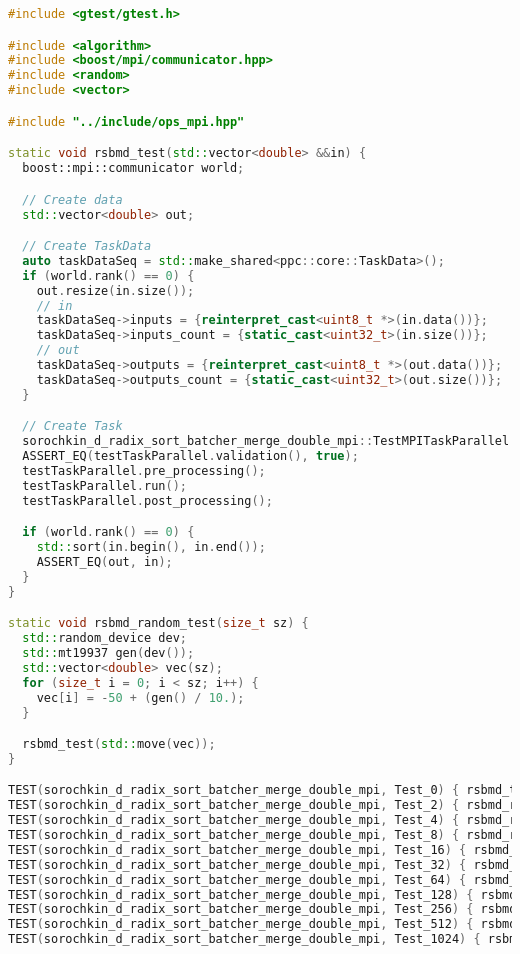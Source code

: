 \documentclass[12pt]{article}
\begin{document}
\begin{lstlisting}[language=C++, caption={Код алгоритма}]
#include <gtest/gtest.h>

#include <algorithm>
#include <boost/mpi/communicator.hpp>
#include <random>
#include <vector>

#include "../include/ops_mpi.hpp"

static void rsbmd_test(std::vector<double> &&in) {
  boost::mpi::communicator world;

  // Create data
  std::vector<double> out;

  // Create TaskData
  auto taskDataSeq = std::make_shared<ppc::core::TaskData>();
  if (world.rank() == 0) {
    out.resize(in.size());
    // in
    taskDataSeq->inputs = {reinterpret_cast<uint8_t *>(in.data())};
    taskDataSeq->inputs_count = {static_cast<uint32_t>(in.size())};
    // out
    taskDataSeq->outputs = {reinterpret_cast<uint8_t *>(out.data())};
    taskDataSeq->outputs_count = {static_cast<uint32_t>(out.size())};
  }

  // Create Task
  sorochkin_d_radix_sort_batcher_merge_double_mpi::TestMPITaskParallel testTaskParallel(taskDataSeq);
  ASSERT_EQ(testTaskParallel.validation(), true);
  testTaskParallel.pre_processing();
  testTaskParallel.run();
  testTaskParallel.post_processing();

  if (world.rank() == 0) {
    std::sort(in.begin(), in.end());
    ASSERT_EQ(out, in);
  }
}

static void rsbmd_random_test(size_t sz) {
  std::random_device dev;
  std::mt19937 gen(dev());
  std::vector<double> vec(sz);
  for (size_t i = 0; i < sz; i++) {
    vec[i] = -50 + (gen() / 10.);
  }

  rsbmd_test(std::move(vec));
}

TEST(sorochkin_d_radix_sort_batcher_merge_double_mpi, Test_0) { rsbmd_test({}); }
TEST(sorochkin_d_radix_sort_batcher_merge_double_mpi, Test_2) { rsbmd_random_test(2); }
TEST(sorochkin_d_radix_sort_batcher_merge_double_mpi, Test_4) { rsbmd_random_test(4); }
TEST(sorochkin_d_radix_sort_batcher_merge_double_mpi, Test_8) { rsbmd_random_test(8); }
TEST(sorochkin_d_radix_sort_batcher_merge_double_mpi, Test_16) { rsbmd_random_test(16); }
TEST(sorochkin_d_radix_sort_batcher_merge_double_mpi, Test_32) { rsbmd_random_test(32); }
TEST(sorochkin_d_radix_sort_batcher_merge_double_mpi, Test_64) { rsbmd_random_test(64); }
TEST(sorochkin_d_radix_sort_batcher_merge_double_mpi, Test_128) { rsbmd_random_test(128); }
TEST(sorochkin_d_radix_sort_batcher_merge_double_mpi, Test_256) { rsbmd_random_test(256); }
TEST(sorochkin_d_radix_sort_batcher_merge_double_mpi, Test_512) { rsbmd_random_test(512); }
TEST(sorochkin_d_radix_sort_batcher_merge_double_mpi, Test_1024) { rsbmd_random_test(1024); }


\end{lstlisting}
\end{document}
